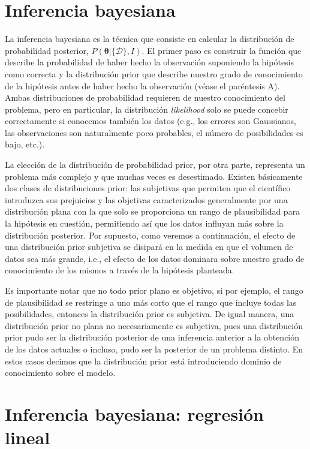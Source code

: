 \documentclass[a4paper,twoside]{article}
\newcommand{\hip}{\ensuremath{\bm{\theta}}\xspace}
\newcommand{\dat}{\ensuremath{\{\mathcal{D}\}}\xspace}
\begin{document}
\section{Inferencia bayesiana}
%
La inferencia bayesiana es la técnica que consiste en calcular la distribución de probabilidad
posterior, $P(\hip|\dat,I)$. El primer paso es construir la función que describe la probabilidad de
haber hecho la observación suponiendo la hipótesis como correcta y la distribución prior que
describe nuestro grado de conocimiento de la hipótesis antes de haber hecho la observación (véase el
paréntesis A). Ambas distribuciones de probabilidad requieren de nuestro conocimiento del problema,
pero en particular, la distribución \emph{likelihood} solo se puede concebir correctamente si
conocemos también los datos (e.g., los errores son Gaussianos, las observaciones son naturalmente
poco probables, el número de posibilidades es bajo, etc.).

La elección de la distribución de probabilidad prior, por otra parte, representa un problema más
complejo y que muchas veces es desestimado. Existen básicamente dos clases de distribuciones prior:
las subjetivas que permiten que el científico introduzca sus prejuicios y las objetivas
caracterizados generalmente por una distribución plana con la que solo se proporciona un rango de
plausibilidad para la hipótesis en cuestión, permitiendo así que los datos influyan más sobre la
distribución posterior. Por supuesto, como veremos a continuación, el efecto de una distribución
prior subjetiva se disipará en la medida en que el volumen de datos sea más grande, i.e., el efecto
de los datos dominara sobre nuestro grado de conocimiento de los mismos a través de la hipótesis
planteada.

Es importante notar que no todo prior plano es objetivo, si por ejemplo, el rango de plausibilidad
se restringe a uno más corto que el rango que incluye todas las posibilidades, entonces la
distribución prior es subjetiva. De igual manera, una distribución prior no plana no necesariamente
es subjetiva, pues una distribución prior pudo ser la distribución posterior de una inferencia
anterior a la obtención de los datos actuales o incluso, pudo ser la posterior de un problema
distinto. En estos casos decimos que la distribución prior está introduciendo dominio de
conocimiento sobre el modelo.

\section{Inferencia bayesiana: regresión lineal}
\end{document}
